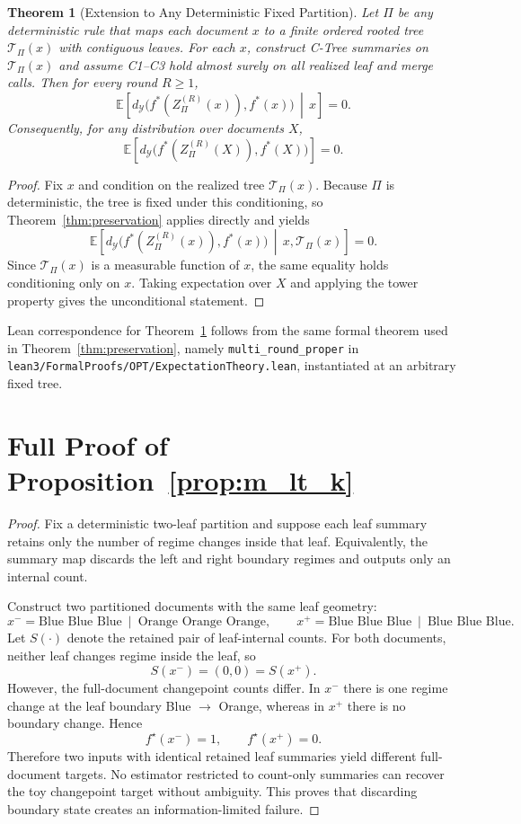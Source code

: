 \documentclass[11pt]{article}
\newtheorem{theorem}{Theorem}
\newcommand{\E}{\mathbb{E}}
\newcommand{\Y}{\mathcal{Y}}
\newcommand{\metric}{d_{\Y}}
\newcommand{\fstar}{f^\ast}
\begin{document}
\begin{theorem}[Extension to Any Deterministic Fixed Partition]\label{thm:fixed-partition}
Let $\Pi$ be any deterministic rule that maps each document $x$ to a finite ordered rooted tree $\mathcal{T}_\Pi(x)$ with contiguous leaves. For each $x$, construct C-Tree summaries on $\mathcal{T}_\Pi(x)$ and assume C1--C3 hold almost surely on all realized leaf and merge calls. Then for every round $R\ge 1$,
\[
\E\!\left[\metric\!\big(\fstar(Z_\Pi^{(R)}(x)),\fstar(x)\big)\,\middle|\,x\right]=0.
\]
Consequently, for any distribution over documents $X$,
\[
\E\!\left[\metric\!\big(\fstar(Z_\Pi^{(R)}(X)),\fstar(X)\big)\right]=0.
\]
\end{theorem}

\begin{proof}
Fix $x$ and condition on the realized tree $\mathcal{T}_\Pi(x)$. Because $\Pi$ is deterministic, the tree is fixed under this conditioning, so Theorem~\ref{thm:preservation} applies directly and yields
\[
\E\!\left[\metric\!\big(\fstar(Z_\Pi^{(R)}(x)),\fstar(x)\big)\,\middle|\,x,\mathcal{T}_\Pi(x)\right]=0.
\]
Since $\mathcal{T}_\Pi(x)$ is a measurable function of $x$, the same equality holds conditioning only on $x$. Taking expectation over $X$ and applying the tower property gives the unconditional statement.
\end{proof}

Lean correspondence for Theorem~\ref{thm:fixed-partition} follows from the same formal theorem used in Theorem~\ref{thm:preservation}, namely \texttt{multi\_round\_proper} in \texttt{lean3/FormalProofs/OPT/ExpectationTheory.lean}, instantiated at an arbitrary fixed tree.

\section{Full Proof of Proposition~\ref{prop:m_lt_k}}\label{app:proof-m-lt-k}

\begin{proof}
Fix a deterministic two-leaf partition and suppose each leaf summary retains only the number of regime changes inside that leaf.
Equivalently, the summary map discards the left and right boundary regimes and outputs only an internal count.

Construct two partitioned documents with the same leaf geometry:
\[
x^- = \text{Blue Blue Blue}\ \mid\ \text{Orange Orange Orange},
\qquad
x^+ = \text{Blue Blue Blue}\ \mid\ \text{Blue Blue Blue}.
\]
Let $S(\cdot)$ denote the retained pair of leaf-internal counts.
For both documents, neither leaf changes regime inside the leaf, so
\[
S(x^-)= (0,0)=S(x^+).
\]
However, the full-document changepoint counts differ.
In $x^-$ there is one regime change at the leaf boundary Blue $\rightarrow$ Orange, whereas in $x^+$ there is no boundary change.
Hence
\[
f^\star(x^-)=1,\qquad f^\star(x^+)=0.
\]
Therefore two inputs with identical retained leaf summaries yield different full-document targets.
No estimator restricted to count-only summaries can recover the toy changepoint target without ambiguity.
This proves that discarding boundary state creates an information-limited failure.
\end{proof}
\end{document}
